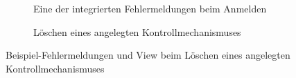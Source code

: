 \documentclass[notables, nomenclature, oneside, 150]{HSMW-Thesis}
\begin{document}
\begin{figure}[h]
\begin{subfigure}[t]{0.3\textwidth}
        	\caption{Eine der integrierten Fehlermeldungen beim Anmelden}
        	\label{fig:13}
    	\end{subfigure}
    	\begin{subfigure}[t]{0.3\textwidth}
        	\caption{Löschen eines angelegten Kontrollmechanismuses}
        	\label{fig:l5}
    	\end{subfigure}
    	\caption{Beispiel-Fehlermeldungen und View beim Löschen eines angelegten Kontrollmechanismuses}
		\label{fig:zusatz2}
	\end{figure}
	
\end{document}
